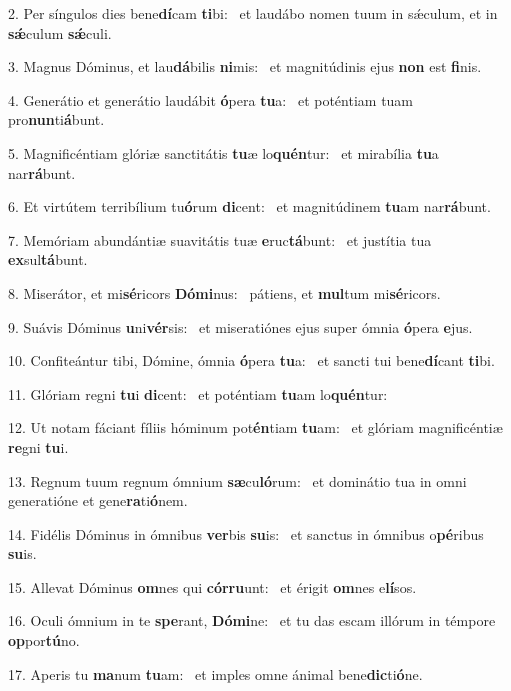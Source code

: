 2. Per síngulos dies bene\textbf{dí}cam \textbf{ti}bi: \ast\  et laudábo nomen tuum in sǽculum, et in \textbf{sǽ}culum \textbf{sǽ}culi.\

3. Magnus Dóminus, et lau\textbf{dá}bilis \textbf{ni}mis: \ast\  et magnitúdinis ejus \textbf{non} est \textbf{fi}nis.\

4. Generátio et generátio laudábit \textbf{ó}pera \textbf{tu}a: \ast\  et poténtiam tuam pro\textbf{nun}ti\textbf{á}bunt.\

5. Magnificéntiam glóriæ sanctitátis \textbf{tu}æ lo\textbf{quén}tur: \ast\  et mirabília \textbf{tu}a nar\textbf{rá}bunt.\

6. Et virtútem terribílium tu\textbf{ó}rum \textbf{di}cent: \ast\  et magnitúdinem \textbf{tu}am nar\textbf{rá}bunt.\

7. Memóriam abundántiæ suavitátis tuæ \textbf{e}ruc\textbf{tá}bunt: \ast\  et justítia tua \textbf{ex}sul\textbf{tá}bunt.\

8. Miserátor, et mi\textbf{sé}ricors \textbf{Dó}\textbf{mi}nus: \ast\  pátiens, et \textbf{mul}tum mi\textbf{sé}ricors.\

9. Suávis Dóminus \textbf{u}ni\textbf{vér}sis: \ast\  et miseratiónes ejus super ómnia \textbf{ó}pera \textbf{e}jus.\

10. Confiteántur tibi, Dómine, ómnia \textbf{ó}pera \textbf{tu}a: \ast\  et sancti tui bene\textbf{dí}cant \textbf{ti}bi.\

11. Glóriam regni \textbf{tu}i \textbf{di}cent: \ast\  et poténtiam \textbf{tu}am lo\textbf{quén}tur:\

12. Ut notam fáciant fíliis hóminum pot\textbf{én}tiam \textbf{tu}am: \ast\  et glóriam magnificéntiæ \textbf{re}gni \textbf{tu}i.\

13. Regnum tuum regnum ómnium \textbf{sæ}cu\textbf{ló}rum: \ast\  et dominátio tua in omni generatióne et gene\textbf{ra}ti\textbf{ó}nem.\

14. Fidélis Dóminus in ómnibus \textbf{ver}bis \textbf{su}is: \ast\  et sanctus in ómnibus o\textbf{pé}ribus \textbf{su}is.\

15. Allevat Dóminus \textbf{om}nes qui \textbf{cór}\textbf{ru}unt: \ast\  et érigit \textbf{om}nes e\textbf{lí}sos.\

16. Oculi ómnium in te \textbf{spe}rant, \textbf{Dó}\textbf{mi}ne: \ast\  et tu das escam illórum in témpore \textbf{op}por\textbf{tú}no.\

17. Aperis tu \textbf{ma}num \textbf{tu}am: \ast\  et imples omne ánimal bene\textbf{dic}ti\textbf{ó}ne.\

